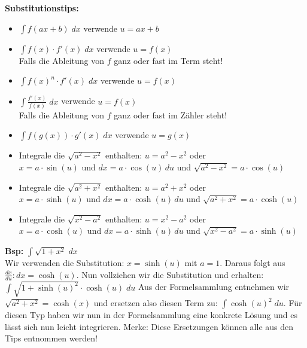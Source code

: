 \textbf{Substitutionstips:}
{\small
\begin{itemize}
	\item $\int f(ax + b) \; dx$ verwende $u = ax + b$
	\vspace{0.1cm}
	
	\item $\int f(x) \cdot f'(x) \; dx$ verwende $u = f(x)$\\
	Falls die Ableitung von $f$ ganz oder fast im Term steht!
	\vspace{0.1cm}
	
	\item $\int f(x)^n \cdot f'(x) \; dx$ verwende $u = f(x)$
	\vspace{0.1cm}

	\item $\int \frac{f'(x)}{f(x)} \; dx$ verwende $u = f(x)$\\
	Falls die Ableitung von $f$ ganz oder fast im Zähler steht!
	\vspace{0.1cm}

	\item $\int f(g(x)) \cdot g'(x) \; dx$ verwende $u = g(x)$
	\vspace{0.1cm}
	
	\item Integrale die $\sqrt{a^2 - x^2}$ enthalten: $u = a^2 - x^2$ oder\\
	$x = a \cdot \sin(u) $ und $dx = a \cdot \cos(u) \, du$ und $\sqrt{a^2 - x^2} = a \cdot \cos(u)$
	\vspace{0.1cm}

	\item Integrale die $\sqrt{a^2 + x^2}$ enthalten: $u = a^2 + x^2$ oder\\
	$x = a \cdot \sinh(u) $ und $dx = a \cdot \cosh(u) \, du$ und $\sqrt{a^2 + x^2} = a \cdot \cosh(u)$

	\vspace{0.1cm}
	\item Integrale die $\sqrt{x^2 - a^2}$ enthalten: $u = x^2 - a^2$ oder\\
	$x = a \cdot \cosh(u) $ und $dx = a \cdot \sinh(u) \, du$ und $\sqrt{x^2 - a^2} = a \cdot \sinh(u)$
\end{itemize}
\textbf{Bsp:} $\int \sqrt{1 + x^2} \; dx$\\
Wir verwenden die Substitution: $x = \sinh(u)$ mit $a = 1$. Daraus folgt aus $\frac{dx}{du}: dx = \cosh(u)$. 
Nun vollziehen wir die Substitution und erhalten: $\int \sqrt{1 + \sinh(u)^2} \cdot \cosh(u) \; du$
Aus der Formelsammlung entnehmen wir $\sqrt{a^2 + x^2} = \cosh(x)$ und ersetzen also diesen Term zu:  
$\int \cosh(u)^2 \; du$. Für diesen Typ haben wir nun in der Formelsammlung eine konkrete Lösung und es lässt sich nun leicht integrieren. Merke: Diese Ersetzungen können alle aus den Tips entnommen werden!
}

